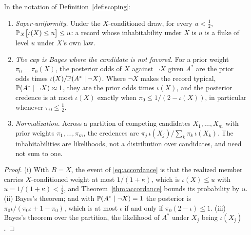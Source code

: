 \begin{proposition}
\label{prop:scoping}
In the notation of Definition~\ref{def:scoping}:
\begin{enumerate}[label=\emph{(\roman*)},itemsep=2pt]
\item \emph{Super-uniformity.} Under the $X$-conditioned draw, for every
$u<\tfrac12$, $\mathbb{P}_X\bigl[\iota(X)\le u\bigr]\le u$: a record whose
inhabitability under $X$ is $u$ is a fluke of level $u$ under $X$'s own
law.
\item \emph{The cap is Bayes where the candidate is not favored.} For a
prior weight $\pi_0=\pi_0(X)$, the posterior odds of $X$ against $\neg X$
given $A^\ast$ are the prior odds times
$\iota(X)/\mathbb{P}(A^\ast\mid\neg X)$. Where $\neg X$ makes the record
typical, $\mathbb{P}(A^\ast\mid\neg X)\approx1$, they are the prior odds times
$\iota(X)$, and the posterior credence is at most $\iota(X)$ exactly when
$\pi_0\le1/(2-\iota(X))$, in particular whenever $\pi_0\le\tfrac12$.
\item \emph{Normalization.} Across a partition of competing candidates
$X_1,\dots,X_m$ with prior weights $\pi_1,\dots,\pi_m$, the credences
are $\pi_j\,\iota(X_j)/\sum_k\pi_k\,\iota(X_k)$. The inhabitabilities
are likelihoods, not a distribution over candidates, and need not sum to
one.
\end{enumerate}
\end{proposition}

\begin{proof}
(i) With $B=X$, the event of \eqref{eq:accordance} is that the realized
member carries $X$-conditioned weight at most $1/(1+\kappa)$, which is
$\iota(X)\le u$ with $u=1/(1+\kappa)<\tfrac12$, and
Theorem~\ref{thm:accordance} bounds its probability by $u$. (ii) Bayes's
theorem; and with $\mathbb{P}(A^\ast\mid\neg X)=1$ the posterior is
$\pi_0\iota/(\pi_0\iota+1-\pi_0)$, which is at most $\iota$ if and only
if $\pi_0(2-\iota)\le1$. (iii) Bayes's theorem over the partition, the
likelihood of $A^\ast$ under $X_j$ being $\iota(X_j)$.
\end{proof}

